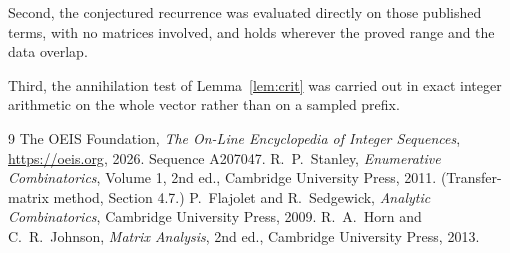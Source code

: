 \documentclass[11pt,a4paper]{article}
\theoremstyle{plain}
\theoremstyle{definition}
\begin{document}
Second, the conjectured recurrence was evaluated directly on those published terms, with no
matrices involved, and holds wherever the proved range and the data overlap.

Third, the annihilation test of Lemma~\ref{lem:crit} was carried out in exact integer
arithmetic on the whole vector rather than on a sampled prefix.

\begin{thebibliography}{9}
 The OEIS Foundation, \emph{The On-Line Encyclopedia of Integer
Sequences}, \url{https://oeis.org}, 2026. Sequence A207047.
 R.~P.~Stanley, \emph{Enumerative Combinatorics}, Volume 1, 2nd ed.,
Cambridge University Press, 2011. (Transfer-matrix method, Section 4.7.)
 P.~Flajolet and R.~Sedgewick, \emph{Analytic Combinatorics}, Cambridge
University Press, 2009.
 R.~A.~Horn and C.~R.~Johnson, \emph{Matrix Analysis}, 2nd ed., Cambridge
University Press, 2013.
\end{thebibliography}
\end{document}
